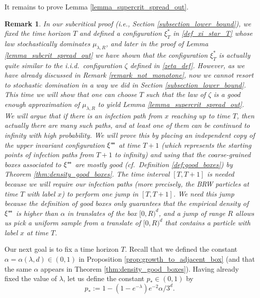 \documentclass[a4paper,12pt]{article}
\newtheorem  {remark}        [theorem]{Remark}
\newcommand{\sstar}{* \hspace{-.05cm} *}
\begin{document}
It remains to prove Lemma \ref{lemma_supercrit_spread_out}.

\begin{remark}\label{remark_supercrit_plan_heu}
In our subcritical proof (i.e.,  Section \ref{subsection_lower_bound}), we fixed the time horizon $T$
and defined a configuration $\xi^*_T$  in \eqref{def_xi_star_T} whose law stochastically dominates $\mu_{\lambda,R}$, and later in the proof of Lemma \ref{lemma_subcrit_spread_out}
we have shown that the configuration $\xi^*_T$ is actually quite similar to the i.i.d.\ configuration $\zeta$ defined in \eqref{zeta_def}.
However, as we have already discussed in Remark \ref{remark_not_monotone}, now we cannot resort to stochastic domination in a way we did in Section \ref{subsection_lower_bound}. This time we will show that one can choose $T$ such that the law of $\zeta$ is a good enough approximation of  $\mu_{\lambda,R}$ to yield Lemma \ref{lemma_supercrit_spread_out}. We will argue that
if there is an infection path from $x$ reaching up to time $T$, then actually there are many such paths, and at least one of them can be continued to infinity with high probability.
 We will prove this by
placing an independent copy of the upper invariant configuration $\xi^{\sstar}$ at time $T+1$ (which represents the starting points of infection paths from $T+1$ to infinity) and using that the coarse-grained boxes  associated to $\xi^{\sstar}$ are mostly good (cf.\ Definition \ref{def:good_boxes})  by Theorem \ref{thm:density_good_boxes}. The time interval $[T,T+1]$ is needed because we will require our infection paths (more precisely, the BRW particles at time $T$ with label $x$) to perform one jump in $[T,T+1]$. We need this jump because
 the definition of good boxes  only guarantees that the empirical density of $\xi^{\sstar}$ is higher than $\alpha$ in translates of
 the box $[0,R )^d$, and a jump of range $R$ allows us pick a uniform sample from a translate of $[0,R )^d$ that contains a particle with label $x$ at time $T$.
 \end{remark}

Our next goal is to fix a time horizon $T$. Recall that we  defined the constant $\alpha=\alpha(\lambda,d) \in (0,1)$ in Proposition \ref{prop:growth_to_adjacent_box} (and that the same $\alpha$ appears in Theorem \ref{thm:density_good_boxes}). Having already fixed the value of $\lambda$, let us define the constant $p_* \in (0,1)$ by
\begin{equation}\label{p_star}
  p_*  := 1-(1-e^{-\lambda})e^{-2}\alpha/3^{d}.
\end{equation}
\end{document}
